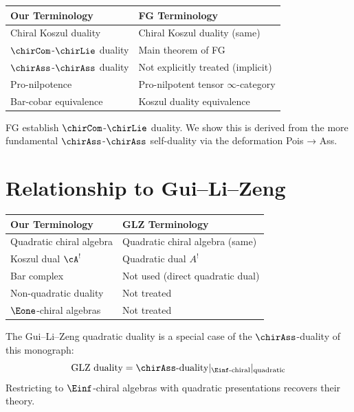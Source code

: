 \begin{tabular}{>{\raggedright\arraybackslash}p{}>{\raggedright\arraybackslash}p{}}
\textbf{Our Terminology} & \textbf{FG Terminology} \\
\hline
Chiral Koszul duality & Chiral Koszul duality (same) \\
$\chirCom$-$\chirLie$ duality & Main theorem of FG \\
$\chirAss$-$\chirAss$ duality & Not explicitly treated (implicit) \\
Pro-nilpotence & Pro-nilpotent tensor $\infty$-category \\
Bar-cobar equivalence & Koszul duality equivalence \\
\end{tabular}

\begin{remark}
FG establish $\chirCom$-$\chirLie$ duality. We show this is derived from the more fundamental $\chirAss$-$\chirAss$ self-duality via the deformation Pois → Ass.
\end{remark}

\section{Relationship to Gui--Li--Zeng}

\begin{tabular}{>{\raggedright\arraybackslash}p{}>{\raggedright\arraybackslash}p{}}
\textbf{Our Terminology} & \textbf{GLZ Terminology} \\
\hline
Quadratic chiral algebra & Quadratic chiral algebra (same) \\
Koszul dual $\cA^!$ & Quadratic dual $A^!$ \\
Bar complex & Not used (direct quadratic dual) \\
Non-quadratic duality & Not treated \\
$\Eone$-chiral algebras & Not treated \\
\end{tabular}

\begin{proposition}\label{prop:glz-special-case}
The Gui--Li--Zeng quadratic duality is a special case of the $\chirAss$-duality of this monograph:
\[
\text{GLZ duality} = \chirAss\text{-duality} |_{\Einf\text{-chiral}} |_{\text{quadratic}}
\]
Restricting to $\Einf$-chiral algebras with quadratic presentations recovers their theory.
\end{proposition}

